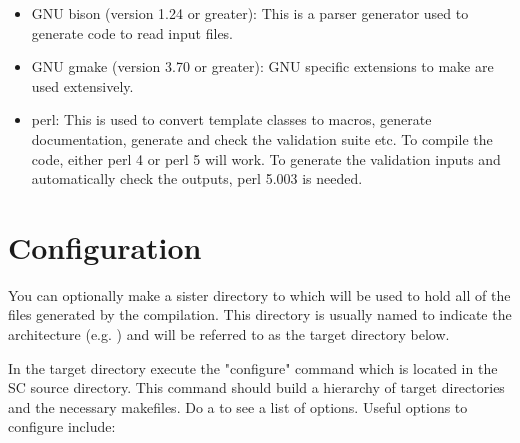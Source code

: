 \begin{itemize}
    \item GNU bison (version 1.24 or greater): This is a parser generator used
          to generate code to read input files.

    \item GNU gmake (version 3.70 or greater): GNU specific extensions to make
          are used extensively.

    \item perl: This is used to convert template classes to macros,
          generate documentation, generate and check the validation suite
          etc.  To compile the code, either perl 4 or perl 5 will work.  To
          generate the validation inputs and automatically check the
          outputs, perl 5.003 is needed.

  \end{itemize}

\section{Configuration}

 You can optionally make a sister directory to  which will be
used to hold all of the files generated by the compilation.  This directory
is usually named to indicate the architecture (e.g. )
and will be referred to as the target directory below.

 In the target directory execute the "configure" command which is located
in the SC source directory. This command should build a hierarchy of
target directories and the necessary makefiles. Do a  to see a list of options.  Useful options to configure
include:


